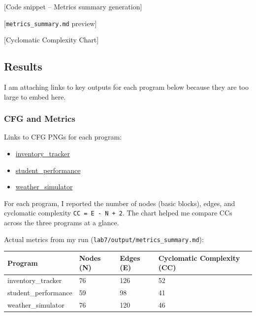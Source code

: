 [Code snippet -- Metrics summary generation]

[\texttt{metrics\_summary.md} preview]

[Cyclomatic Complexity Chart]

\subsection{Results}

I am attaching links to key outputs for each program below because they are too large to embed here.

\subsubsection{CFG and Metrics}

Links to CFG PNGs for each program:
\begin{itemize}[itemsep=0em, topsep=0pt]
    \item \href{https://github.com/ShardulJunagade/cs202-stt/tree/main/lab7/output/inventory_tracker/cfg.png}{inventory\_tracker}
    \item \href{https://github.com/ShardulJunagade/cs202-stt/tree/main/lab7/output/student_performance/cfg.png}{student\_performance}
    \item \href{https://github.com/ShardulJunagade/cs202-stt/tree/main/lab7/output/weather_simulator/cfg.png}{weather\_simulator}
\end{itemize}

For each program, I reported the number of nodes (basic blocks), edges, and cyclomatic complexity \texttt{CC = E - N + 2}. The chart helped me compare CCs across the three programs at a glance.

Actual metrics from my run (\texttt{lab7/output/metrics\_summary.md}):

\begin{table}[H]
\centering
\begin{tabular}{|l|l|l|l|}
\hline
Program & Nodes (N) & Edges (E) & Cyclomatic Complexity (CC) \\
\hline
inventory\_tracker & 76 & 126 & 52 \\
student\_performance & 59 & 98 & 41 \\
weather\_simulator & 76 & 120 & 46 \\
\hline
\end{tabular}
\end{table}

